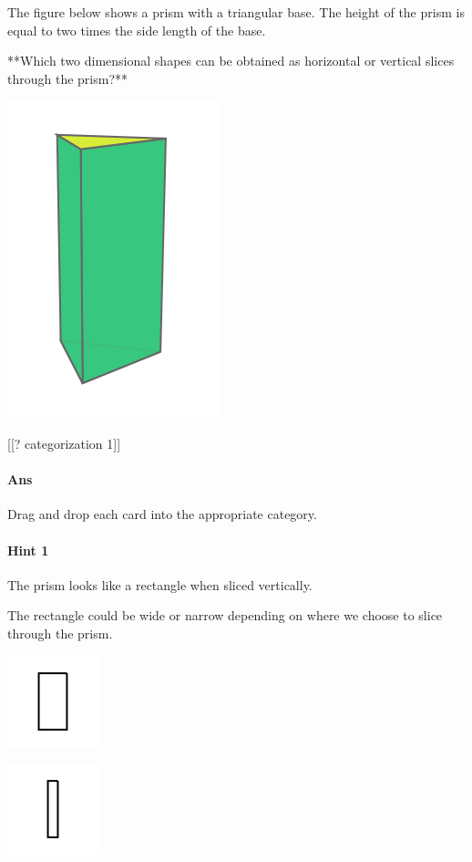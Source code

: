 \documentclass[twocolumn,10pt]{article}
\def\shrinkfactor{0.4}
\begin{document}
\noindent
The figure below shows a prism with a triangular base. The height of the prism is equal to two times the side length of the base. 

**Which two dimensional shapes can be obtained as  horizontal or vertical slices through the prism?**  


\includegraphics[scale=\shrinkfactor]{figures/bc0dd6be76a7e7e42d7bc2db7a75bc30a90d3b83.png}

[[? categorization 1]]

\paragraph{Ans} Drag and drop each card into the appropriate category. 

\paragraph{Hint 1}The prism looks like a rectangle when sliced vertically.
  
The rectangle could be wide or narrow depending on where we choose to slice through the prism.


\includegraphics[scale=\shrinkfactor]{figures/225bc3d058cebe2059fc56f78ef80b5f3e0f2da7.png} 

\includegraphics[scale=\shrinkfactor]{figures/ef45ed2bac2d4bba3b359503260d04f6028634cd.png} 
\end{document}

